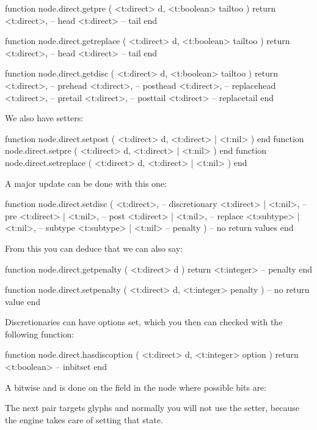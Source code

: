 function node.direct.getpre ( <t:direct> d, <t:boolean> tailtoo )
    return
        <t:direct>, -- head
        <t:direct>  -- tail
end

function node.direct.getreplace ( <t:direct> d, <t:boolean> tailtoo )
    return
        <t:direct>, -- head
        <t:direct>  -- tail
end
\stoptyping

\starttyping[option=LUA]
function node.direct.getdisc ( <t:direct> d, <t:boolean> tailtoo )
    return
        <t:direct>, -- prehead
        <t:direct>, -- posthead
        <t:direct>, -- replacehead
        <t:direct>, -- pretail
        <t:direct>, -- posttail
        <t:direct>  -- replacetail
end
\stoptyping

We also have setters:

\starttyping[option=LUA]
function node.direct.setpost    ( <t:direct> d, <t:direct> | <t:nil> ) end
function node.direct.setpre     ( <t:direct> d, <t:direct> | <t:nil> ) end
function node.direct.setreplace ( <t:direct> d, <t:direct> | <t:nil> ) end
\stoptyping

A major update can be done with this one:

\starttyping[option=LUA]
function node.direct.setdisc (
    <t:direct>,            -- discretionary
    <t:direct>  | <t:nil>, -- pre
    <t:direct>  | <t:nil>, -- post
    <t:direct>  | <t:nil>, -- replace
    <t:subtype> | <t:nil>, -- subtype
    <t:subtype> | <t:nil>  -- penalty
)
    -- no return values
end
\stoptyping

From this you can deduce that we can also say:

\starttyping[option=LUA]
function node.direct.getpenalty ( <t:direct> d )
    return <t:integer> -- penalty
end

function node.direct.setpenalty ( <t:direct> d, <t:integer> penalty )
    -- no return value
end
\stoptyping

Discretionaries can have options set, which you then can checked with
the following function:

\starttyping[option=LUA]
function node.direct.hasdiscoption ( <t:direct> d, <t:integer> option )
    return <t:boolean> -- inbitset
end
\stoptyping

A bitwise and is done on the field in the node where possible bits are:


The next pair targets glyphs and normally you will not use the setter, because
the engine takes care of setting that state.

